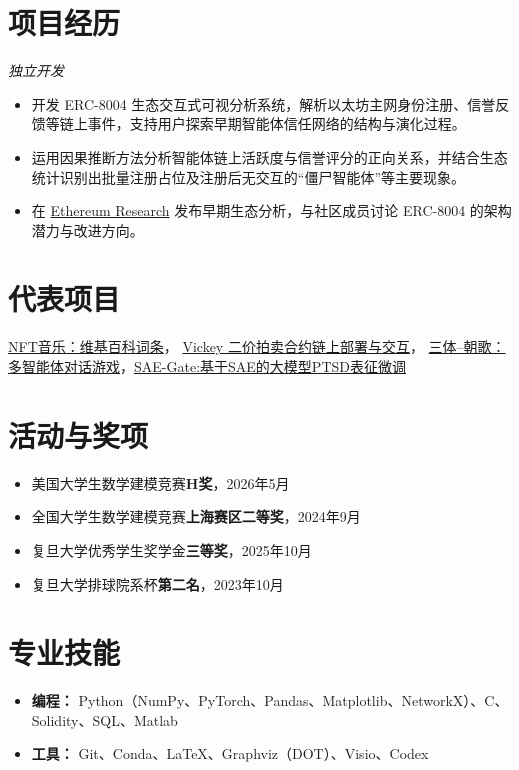 \documentclass{resume}
\begin{document}
\section{项目经历}

\textit{独立开发}
\begin{itemize}[parsep=0.2ex]
  \item 开发 ERC-8004 生态交互式可视分析系统，解析以太坊主网身份注册、信誉反馈等链上事件，支持用户探索早期智能体信任网络的结构与演化过程。
  \item 运用因果推断方法分析智能体链上活跃度与信誉评分的正向关系，并结合生态统计识别出批量注册占位及注册后无交互的“僵尸智能体”等主要现象。
  \item 在 \href{https://ethresear.ch/t/does-erc-8004-form-an-agent-to-agent-trust-network/25322}{Ethereum Research} 发布早期生态分析，与社区成员讨论 ERC-8004 的架构潜力与改进方向。
\end{itemize}

\section{代表项目}
\href{https://en.wikipedia.org/wiki/NFT_music}{{NFT音乐：维基百科词条}}， \href{https://sepolia.etherscan.io/address/0xac0f3f908c1115bdba543c2e22c8305a55621c3a}{{Vickey 二价拍卖合约链上部署与交互}}， \href{https://github.com/OB-David/ThreeBody-ZHAOGE}{{三体--朝歌：多智能体对话游戏}}，\href{https://github.com/OB-David/SAE-Gate}{SAE-Gate:基于SAE的大模型PTSD表征微调}

\section{活动与奖项}
\begin{itemize}[parsep=0.2ex]
  \item 美国大学生数学建模竞赛\textbf{H奖}，2026年5月
  \item 全国大学生数学建模竞赛\textbf{上海赛区二等奖}，2024年9月
  \item 复旦大学优秀学生奖学金\textbf{三等奖}，2025年10月
  \item 复旦大学排球院系杯\textbf{第二名}，2023年10月
\end{itemize}

\section{专业技能}
\begin{itemize}[parsep=0.2ex]
  \item \textbf{编程：} Python（NumPy、PyTorch、Pandas、Matplotlib、NetworkX）、C、Solidity、SQL、Matlab
  \item \textbf{工具：} Git、Conda、\LaTeX、Graphviz（DOT）、Visio、Codex
\end{itemize}
\end{document}
